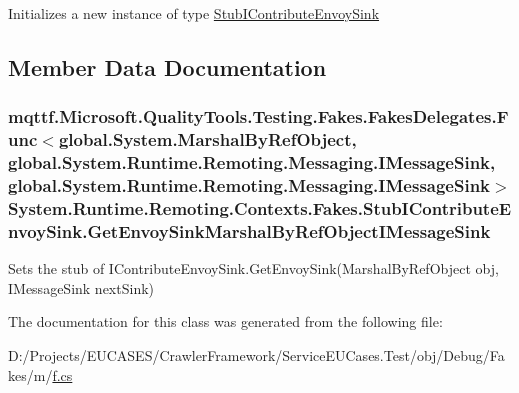 Initializes a new instance of type \hyperlink{class_system_1_1_runtime_1_1_remoting_1_1_contexts_1_1_fakes_1_1_stub_i_contribute_envoy_sink}{Stub\-I\-Contribute\-Envoy\-Sink}



\subsection{Member Data Documentation}
\hypertarget{class_system_1_1_runtime_1_1_remoting_1_1_contexts_1_1_fakes_1_1_stub_i_contribute_envoy_sink_af5486e245caa95f14b7fb2a45505bb45}{
\subsubsection[{Get\-Envoy\-Sink\-Marshal\-By\-Ref\-Object\-I\-Message\-Sink}]{\setlength{\rightskip}{0pt plus 5cm}mqttf.\-Microsoft.\-Quality\-Tools.\-Testing.\-Fakes.\-Fakes\-Delegates.\-Func$<$global.\-System.\-Marshal\-By\-Ref\-Object, global.\-System.\-Runtime.\-Remoting.\-Messaging.\-I\-Message\-Sink, global.\-System.\-Runtime.\-Remoting.\-Messaging.\-I\-Message\-Sink$>$ System.\-Runtime.\-Remoting.\-Contexts.\-Fakes.\-Stub\-I\-Contribute\-Envoy\-Sink.\-Get\-Envoy\-Sink\-Marshal\-By\-Ref\-Object\-I\-Message\-Sink}}\label{class_system_1_1_runtime_1_1_remoting_1_1_contexts_1_1_fakes_1_1_stub_i_contribute_envoy_sink_af5486e245caa95f14b7fb2a45505bb45}


Sets the stub of I\-Contribute\-Envoy\-Sink.\-Get\-Envoy\-Sink(\-Marshal\-By\-Ref\-Object obj, I\-Message\-Sink next\-Sink)



The documentation for this class was generated from the following file\-:\begin{DoxyCompactItemize}
\item 
D\-:/\-Projects/\-E\-U\-C\-A\-S\-E\-S/\-Crawler\-Framework/\-Service\-E\-U\-Cases.\-Test/obj/\-Debug/\-Fakes/m/\hyperlink{m_2f_8cs}{f.\-cs}\end{DoxyCompactItemize}
